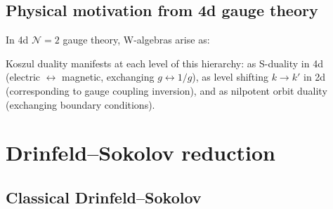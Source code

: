 \subsection{Physical motivation from 4d gauge theory}

\begin{remark}
In 4d $\mathcal{N}=2$ gauge theory, W-algebras arise as:
\begin{center}
\end{center}

Koszul duality manifests at each level of this hierarchy: as S-duality in 4d (electric $\leftrightarrow$ magnetic, exchanging $g \leftrightarrow 1/g$), as level shifting $k \to k'$ in 2d (corresponding to gauge coupling inversion), and as nilpotent orbit duality (exchanging boundary conditions).
\end{remark}

\section{Drinfeld--Sokolov reduction}

\subsection{Classical Drinfeld--Sokolov}

